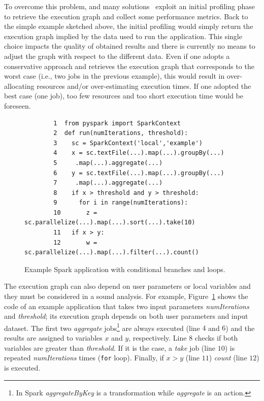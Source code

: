 To overcome this problem, \cSpark and many solutions~\cite{Sidhanta2016, dSpark} exploit an initial profiling phase to retrieve the execution graph and collect some performance metrics. Back to the simple example sketched above, the initial profiling would simply return the execution graph implied by the data used to run the application. This single choice impacts the quality of obtained results and there is currently no means to adjust the graph with respect to the different data.
Even if one adopts a conservative approach and retrieves the execution graph that corresponds to the worst case (i.e., two jobs in the previous example), this would result in over-allocating resources and/or over-estimating execution times. If one adopted the best case (one job), too few resources and too short execution time would be foreseen.

\begin{figure}[htbp]
	\begin{small}
		\begin{verbatim}
		1  from pyspark import SparkContext
		2  def run(numIterations, threshold):
		3    sc = SparkContext('local','example')
		4  	 x = sc.textFile(...).map(...).groupBy(...)
		5     .map(...).aggregate(...)
		6    y = sc.textFile(...).map(...).groupBy(...)
		7     .map(...).aggregate(...)
		8    if x > threshold and y > threshold:
		9      for i in range(numIterations):
		10       z = sc.parallelize(...).map(...).sort(...).take(10)
		11   if x > y:
		12       w = sc.parallelize(...).map(...).filter(...).count()
		\end{verbatim}
	\end{small}
	\caption{Example Spark application with conditional branches and loops.}
	\label{fig:xdag2-code}
\end{figure}


The execution graph can also depend on user parameters or local variables and they must be considered in a sound analysis. For example, Figure~\ref{fig:xdag2-code} shows the code of an example application that takes two input parameters \textit{numIterations} and \textit{threshold}; its execution graph depends on both user parameters and input dataset. The first two \textit{aggregate} jobs\footnote{In Spark \textit{aggregateByKey} is a transformation while \textit{aggregate} is an action.} are always executed (line $4$ and $6$) and the results are assigned to variables $x$ and $y$, respectively. Line $8$ checks if both variables are greater than \textit{threshold}. If it is the case, a \textit{take} job (line $10$) is repeated \textit{numIterations} times (\verb#for# loop). Finally, if $x > y$ (line $11$) \textit{count} (line $12$) is executed. 

